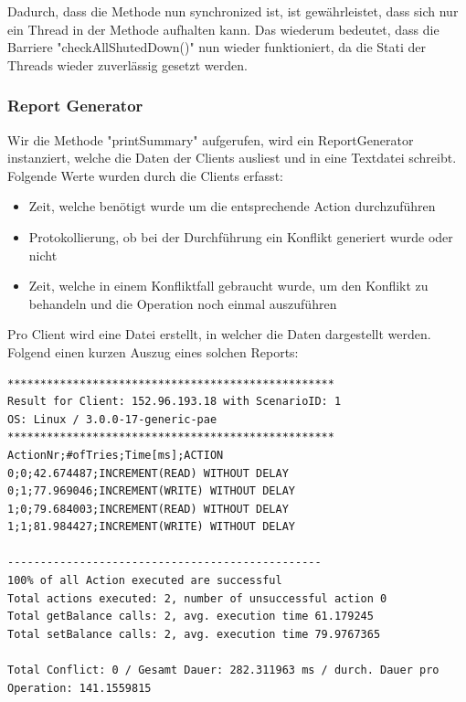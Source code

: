 Dadurch, dass die Methode nun synchronized ist, ist gewährleistet, dass sich nur ein Thread in der Methode aufhalten kann. Das wiederum bedeutet, dass die Barriere "checkAllShutedDown()" nun wieder funktioniert, da die Stati der Threads wieder zuverlässig gesetzt werden.

\subsubsection{Report Generator}
\label{sec:reportGenerator}

Wir die Methode "printSummary" aufgerufen, wird ein ReportGenerator instanziert, welche die Daten der Clients ausliest und in eine Textdatei schreibt. Folgende Werte wurden durch die Clients erfasst:
\begin{itemize}
\item Zeit, welche benötigt wurde um die entsprechende Action durch\-zu\-führen
\item Protokollierung, ob bei der Durchführung ein Konflikt generiert wurde oder nicht
\item Zeit, welche in einem Konfliktfall gebraucht wurde, um den Konflikt zu behandeln und die Operation noch einmal auszuführen
\end{itemize}

Pro Client wird eine Datei erstellt, in welcher die Daten dargestellt werden. Folgend einen kurzen Auszug eines solchen Reports:

\begin{lstlisting}[breaklines=true]
**************************************************
Result for Client: 152.96.193.18 with ScenarioID: 1
OS: Linux / 3.0.0-17-generic-pae
**************************************************
ActionNr;#ofTries;Time[ms];ACTION
0;0;42.674487;INCREMENT(READ) WITHOUT DELAY
0;1;77.969046;INCREMENT(WRITE) WITHOUT DELAY
1;0;79.684003;INCREMENT(READ) WITHOUT DELAY
1;1;81.984427;INCREMENT(WRITE) WITHOUT DELAY

------------------------------------------------
100% of all Action executed are successful
Total actions executed: 2, number of unsuccessful action 0
Total getBalance calls: 2, avg. execution time 61.179245
Total setBalance calls: 2, avg. execution time 79.9767365

Total Conflict: 0 / Gesamt Dauer: 282.311963 ms / durch. Dauer pro Operation: 141.1559815
\end{lstlisting}

